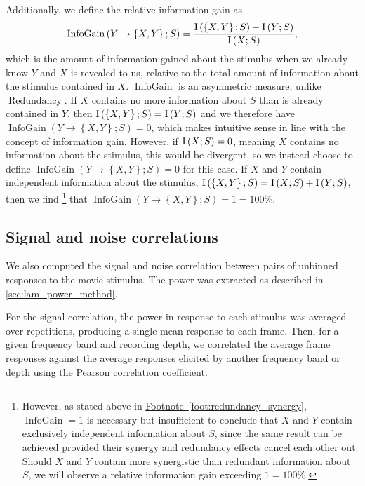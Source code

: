 Additionally, we define the relative information gain as
\begin{equation}
\label{eq:infogain}
\operatorname{InfoGain}\left(Y\to\left\{X,Y\right\};S\right)=\frac{
\operatorname{I}\left(\left\{X,Y\right\};S\right) - \operatorname{I}\left(Y;S\right)
}{
\operatorname{I}\left(X;S\right)
},
\end{equation}
which is the amount of information gained about the stimulus when we already know $Y$ and $X$ is revealed to us, relative to the total amount of information about the stimulus contained in $X$.
$\operatorname{InfoGain}$ is an asymmetric measure, unlike $\operatorname{Redundancy}$.
If $X$ contains no more information about $S$ than is already contained in $Y$, then
$\operatorname{I}\left(\left\{X,Y\right\};S\right) = \operatorname{I}\left(Y;S\right)$
and we therefore have
$\operatorname{InfoGain}\left(Y\to\left\{X,Y\right\};S\right)=0$,
which makes intuitive sense in line with the concept of information gain.
However, if $\operatorname{I}\left(X;S\right)=0$, meaning $X$ contains no information about the stimulus, this would be divergent, so we instead choose to define
$\operatorname{InfoGain}\left(Y\to\left\{X,Y\right\};S\right)=0$
for this case.
If $X$ and $Y$ contain independent information about the stimulus,
$\operatorname{I}\left(\left\{X,Y\right\};S\right) = \operatorname{I}\left(X;S\right) + \operatorname{I}\left(Y;S\right)$,
then we find%
\footnote{
However, as stated above in \hyperref[foot:redundancy_synergy]{Footnote~\ref{foot:redundancy_synergy}},
$\operatorname{InfoGain} = 1$
is necessary but insufficient to conclude that $X$ and $Y$ contain exclusively independent information about $S$, since the same result can be achieved provided their synergy and redundancy effects cancel each other out.
Should $X$ and $Y$ contain more synergistic than redundant information about $S$, we will observe a relative information gain exceeding $1 = 100\%$.
}
that
$
\operatorname{InfoGain}\left(Y\to\left\{X,Y\right\};S\right) = 1 = 100\%
$.


\subsection{Signal and noise correlations}

We also computed the signal and noise correlation between pairs of unbinned responses to the movie stimulus.
The power was extracted as described in \autoref{sec:lam_power_method}.

For the signal correlation, the power in response to each stimulus was averaged over repetitions, producing a single mean response to each frame.
Then, for a given frequency band and recording depth, we correlated the average frame responses against the average responses elicited by another frequency band or depth using the Pearson correlation coefficient.

